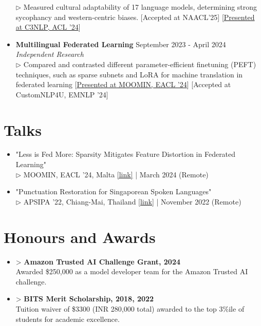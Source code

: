 \documentclass[11pt,letterpaper]{article}
\begin{document}
\begin{itemize}[leftmargin=*,label={},itemsep=6pt]
        $\triangleright$ 
            Measured cultural adaptability of 17 language models, determining strong sycophancy and western-centric biases. [Accepted at NAACL'25] [\href{https://c3nlp.github.io/}{Presented at C3NLP, ACL '24}]
        \\
    \item \textbf{Multilingual Federated Learning} \hfill September 2023 - April 2024\\
        \textit{Independent Research}\\
        $\triangleright$ 
            Compared and contrasted different parameter-efficient finetuning (PEFT) techniques, such as sparse subnets and LoRA for machine translation in federated learning [\href{https://moomin.eacl.org/}{Presented at MOOMIN, EACL '24}] [Accepted at CustomNLP4U, EMNLP '24]
        \\
\end{itemize}

\section*{Talks}
\begin{itemize}[leftmargin=*,label={},itemsep=4pt]
    \item "Less is Fed More: Sparsity Mitigates Feature Distortion in Federated Learning" \textit{}\\
        $\triangleright$ 
            MOOMIN, EACL '24, Malta  \href{https://moomin.eacl.org/}{[link]} \href{https://docs.google.com/presentation/d/1DmnfMR08y_vW9TXLn8fpqYJkntlPMDuC/edit?usp=sharing}{} | March 2024 (Remote)
        \\
    \item "Punctuation Restoration for Singaporean Spoken Languages" \textit{}\\
        $\triangleright$ 
            APSIPA '22, Chiang-Mai, Thailand  \href{https://www.apsipa.org/conference/2022/}{[link]} \href{https://docs.google.com/presentation/d/1DmnfMR08y_vW9TXLn8fpqYJkntlPMDuC/edit?usp=sharing}{} | November 2022 (Remote)
        \\
\end{itemize}

\section*{Honours and Awards}
\begin{itemize}[leftmargin=*,label={},itemsep=4pt]
    \item > \textbf{\textit{} Amazon Trusted AI Challenge Grant, 2024}\\
        Awarded \$250,000 as a model developer team for the Amazon Trusted AI challenge.
    \item > \textbf{\textit{} BITS Merit Scholarship, 2018, 2022}\\
        Tuition waiver of \$3300 (INR 280,000 total) awarded to the top 3\%ile of students for academic excellence.
\end{itemize}
\end{document}
